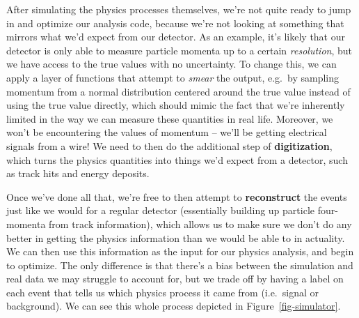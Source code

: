\documentclass[
  11pt,
  numbers=noendperiod]{book}
\begin{document}
After simulating the physics processes themselves, we're not quite ready
to jump in and optimize our analysis code, because we're not looking at
something that mirrors what we'd expect from our detector. As an
example, it's likely that our detector is only able to measure particle
momenta up to a certain \emph{resolution}, but we have access to the
true values with no uncertainty. To change this, we can apply a layer of
functions that attempt to \emph{smear} the output, e.g.~by sampling
momentum from a normal distribution centered around the true value
instead of using the true value directly, which should mimic the fact
that we're inherently limited in the way we can measure these quantities
in real life. Moreover, we won't be encountering the values of momentum
-- we'll be getting electrical signals from a wire! We need to then do
the additional step of \textbf{digitization}, which turns the physics
quantities into things we'd expect from a detector, such as track hits
and energy deposits.

Once we've done all that, we're free to then attempt to
\textbf{reconstruct} the events just like we would for a regular
detector (essentially building up particle four-momenta from track
information), which allows us to make sure we don't do any better in
getting the physics information than we would be able to in actuality.
We can then use this information as the input for our physics analysis,
and begin to optimize. The only difference is that there's a bias
between the simulation and real data we may struggle to account for, but
we trade off by having a label on each event that tells us which physics
process it came from (i.e.~signal or background). We can see this whole
process depicted in Figure~\ref{fig-simulator}.
\end{document}
